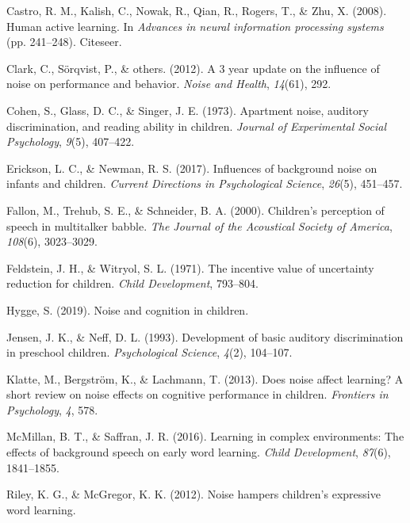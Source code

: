 \documentclass[10pt, letterpaper]{article}
\begin{document}
\leavevmode\hypertarget{ref-castro2008}{}%
Castro, R. M., Kalish, C., Nowak, R., Qian, R., Rogers, T., \& Zhu, X.
(2008). Human active learning. In \emph{Advances in neural information
processing systems} (pp. 241--248). Citeseer.

\leavevmode\hypertarget{ref-clark20123}{}%
Clark, C., Sörqvist, P., \& others. (2012). A 3 year update on the
influence of noise on performance and behavior. \emph{Noise and Health},
\emph{14}(61), 292.

\leavevmode\hypertarget{ref-cohen1973}{}%
Cohen, S., Glass, D. C., \& Singer, J. E. (1973). Apartment noise,
auditory discrimination, and reading ability in children. \emph{Journal
of Experimental Social Psychology}, \emph{9}(5), 407--422.

\leavevmode\hypertarget{ref-erickson2017}{}%
Erickson, L. C., \& Newman, R. S. (2017). Influences of background noise
on infants and children. \emph{Current Directions in Psychological
Science}, \emph{26}(5), 451--457.

\leavevmode\hypertarget{ref-fallon2000}{}%
Fallon, M., Trehub, S. E., \& Schneider, B. A. (2000). Children's
perception of speech in multitalker babble. \emph{The Journal of the
Acoustical Society of America}, \emph{108}(6), 3023--3029.

\leavevmode\hypertarget{ref-feldstein1971}{}%
Feldstein, J. H., \& Witryol, S. L. (1971). The incentive value of
uncertainty reduction for children. \emph{Child Development}, 793--804.

\leavevmode\hypertarget{ref-hygge2019}{}%
Hygge, S. (2019). Noise and cognition in children.

\leavevmode\hypertarget{ref-jensen1993}{}%
Jensen, J. K., \& Neff, D. L. (1993). Development of basic auditory
discrimination in preschool children. \emph{Psychological Science},
\emph{4}(2), 104--107.

\leavevmode\hypertarget{ref-klatte2013}{}%
Klatte, M., Bergström, K., \& Lachmann, T. (2013). Does noise affect
learning? A short review on noise effects on cognitive performance in
children. \emph{Frontiers in Psychology}, \emph{4}, 578.

\leavevmode\hypertarget{ref-mcmillan2016}{}%
McMillan, B. T., \& Saffran, J. R. (2016). Learning in complex
environments: The effects of background speech on early word learning.
\emph{Child Development}, \emph{87}(6), 1841--1855.

\leavevmode\hypertarget{ref-riley2012}{}%
Riley, K. G., \& McGregor, K. K. (2012). Noise hampers children's
expressive word learning.
\end{document}

